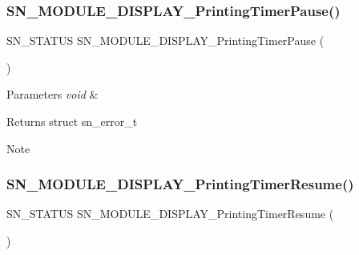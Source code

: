 \subsubsection{\texorpdfstring{S\+N\+\_\+\+M\+O\+D\+U\+L\+E\+\_\+\+D\+I\+S\+P\+L\+A\+Y\+\_\+\+Printing\+Timer\+Pause()}{SN\_MODULE\_DISPLAY\_PrintingTimerPause()}}
{\footnotesize\ttfamily S\+N\+\_\+\+S\+T\+A\+T\+US S\+N\+\_\+\+M\+O\+D\+U\+L\+E\+\_\+\+D\+I\+S\+P\+L\+A\+Y\+\_\+\+Printing\+Timer\+Pause (\begin{DoxyParamCaption}\item[{void}]{ }\end{DoxyParamCaption})}


\begin{DoxyParams}{Parameters}
{\em void} & \\
\hline
\end{DoxyParams}
\begin{DoxyReturn}{Returns}
struct sn\+\_\+error\+\_\+t 
\end{DoxyReturn}
\begin{DoxyNote}{Note}

\end{DoxyNote}
\mbox{\label{group__Module_ga457dd831602b689bb557899b06e69e3c}} 
\subsubsection{\texorpdfstring{S\+N\+\_\+\+M\+O\+D\+U\+L\+E\+\_\+\+D\+I\+S\+P\+L\+A\+Y\+\_\+\+Printing\+Timer\+Resume()}{SN\_MODULE\_DISPLAY\_PrintingTimerResume()}}
{\footnotesize\ttfamily S\+N\+\_\+\+S\+T\+A\+T\+US S\+N\+\_\+\+M\+O\+D\+U\+L\+E\+\_\+\+D\+I\+S\+P\+L\+A\+Y\+\_\+\+Printing\+Timer\+Resume (\begin{DoxyParamCaption}\item[{void}]{ }\end{DoxyParamCaption})}


